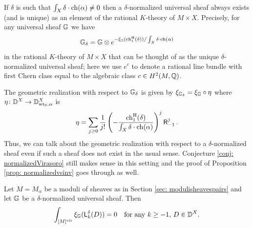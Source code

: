 \documentclass[a4paper, 12pt]{amsart}
\begin{document}
\begin{remark}\label{rem: rationaldeltanormalized}
If $\delta$ is such that $\int_X  \delta\cdot \mathrm{ch}(\alpha)\neq 0$ then a $\delta$-normalized universal sheaf always exists (and is unique) as an element of the rational $K$-theory of $M\times X$. Precisely, for any universal sheaf ${\mathbb{G}}$ we have
\[{\mathbb{G}}_\delta={\mathbb{G}}\otimes e^{-\xi_{\mathbb{G}}(\mathrm{ch}^{\mathrm{H}}_1(\delta))/\int_X \delta\cdot \mathrm{ch}(\alpha)}\]
in the rational $K$-theory of $M\times X$ that can be thought of as the unique $\delta$-normalized universal sheaf; here we use $e^{c}$ to denote a rational line bundle with first Chern class equal to the algebraic class $c\in H^2(M, {\mathbb{Q}})$. 

The geometric realization with respect to ${\mathbb{G}}_\delta$ is given by $\xi_{{\mathbb{G}}_\delta}=\xi_{{\mathbb{G}}}\circ \eta$ where $\eta\colon {\mathbb{D}}^X\to {\mathbb{D}}^X_{{\mathrm{wt}_0},\alpha}$ is 
\[\eta=\sum_{j\geq 0}\frac{1}{j!}\left(-\frac{\mathrm{ch}^{\mathrm{H}}_1(\delta)}{\int_X \delta\cdot \mathrm{ch}(\alpha)}\right)^j\mathsf{R}_{-1}^j\,.\]
Thus, we can talk about the geometric realization with respect to a $\delta$-normalized sheaf even if such a sheaf does not exist in the usual sense. Conjecture \ref{conj: normalizedVirasoro} still makes sense in this setting and the proof of Proposition \ref{prop: normalizedvsinv} goes through as well.
\end{remark}

\begin{conjecture}\label{conj: normalizedVirasoro}
Let $M=M_\alpha$ be a moduli of sheaves as in Section \ref{sec: modulisheavespairs} and let ${\mathbb{G}}$ be a $\delta$-normalized universal sheaf. Then
\[\int_{[M]^{\mathrm{vir}}} \xi_{\mathbb{G}}({\mathsf{L}}_k^\delta(D))=0  \quad \textup{for any }k\geq -1, \, D\in {\mathbb{D}}^X.\]
\end{conjecture}
\end{document}
